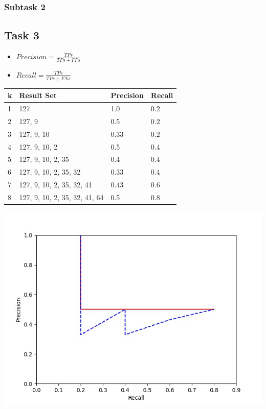 \documentclass[a4paper]{scrartcl}
\begin{document}
\subsubsection*{Subtask 2}


\pagebreak
\subsection*{Task 3}

\begin{itemize}
    \item $Precision = \frac{TPs}{TPs+FPs}$
    \item $Recall = \frac{TPs}{TPs+FNs}$
\end{itemize}

\begin{center}
    \begin{tabular}{@{}llll@{}}
    \hline
    \textbf{k} & \textbf{Result Set}           & \textbf{Precision} & \textbf{Recall} \\ \hline
    1          & 127                           & 1.0                & 0.2             \\
    2          & 127, 9                        & 0.5                & 0.2             \\
    3          & 127, 9, 10                    & 0.33               & 0.2             \\
    4          & 127, 9, 10, 2                 & 0.5                & 0.4             \\
    5          & 127, 9, 10, 2, 35             & 0.4                & 0.4             \\
    6          & 127, 9, 10, 2, 35, 32         & 0.33               & 0.4             \\
    7          & 127, 9, 10, 2, 35, 32, 41     & 0.43               & 0.6             \\
    8          & 127, 9, 10, 2, 35, 32, 41, 64 & 0.5                & 0.8             \\ \hline
    \end{tabular}
    
    \includegraphics[width=.7\textwidth]{img/fig.jpg}
\end{center}
\end{document}
